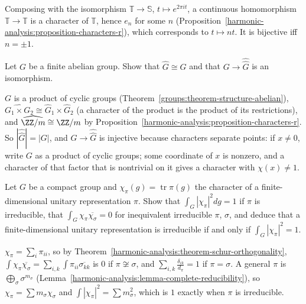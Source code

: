 \begin{solution}
Composing with the isomorphism $\mathbb{T} \to \mathbb{S}$, $t \mapsto e^{2\pi it}$, a continuous homomorphism $\mathbb{T} \to \mathbb{T}$ is a character of $\mathbb{T}$, hence $e_n$ for some $n$
(Proposition~\ref{harmonic-analysis:proposition-characters-r}), which corresponds to $t \mapsto nt$. It is bijective iff $n = \pm 1$.
\end{solution}

\begin{exercise}\label{harmonic-analysis:exercise-dual-finite}
Let $G$ be a finite abelian group. Show that $\widehat G \cong G$ and that $G \to \widehat{\widehat G}$ is an isomorphism.
\end{exercise}

\begin{solution}
$G$ is a product of cyclic groups (Theorem~\ref{groups:theorem-structure-abelian}), $\widehat{G_1 \times G_2} \cong \widehat G_1 \times \widehat G_2$ (a character of the product is the product of its restrictions),
and $\widehat{\ZZ/m} \cong \ZZ/m$ by Proposition~\ref{harmonic-analysis:proposition-characters-r}. So $|\widehat{\widehat G}| = |G|$, and $G \to \widehat{\widehat G}$ is injective because characters separate points: if $x \neq 0$, write
$G$ as a product of cyclic groups; some coordinate of $x$ is nonzero, and a character of that factor that is nontrivial on it gives a character with $\chi(x) \neq 1$.
\end{solution}

\begin{exercise}\label{harmonic-analysis:exercise-characters-orthogonal}
Let $G$ be a compact group and $\chi_\pi(g) = \operatorname{tr}\pi(g)$ the character of a finite-dimensional unitary representation $\pi$. Show that $\int_G|\chi_\pi|^2dg = 1$ if $\pi$ is irreducible, that
$\int_G\chi_\pi\overline{\chi_\sigma} = 0$ for inequivalent irreducible $\pi$, $\sigma$, and deduce that a finite-dimensional unitary representation is irreducible if and only if $\int_G|\chi_\pi|^2 = 1$.
\end{exercise}

\begin{solution}
$\chi_\pi = \sum_i\pi_{ii}$, so by Theorem~\ref{harmonic-analysis:theorem-schur-orthogonality}, $\int\chi_\pi\overline{\chi_\sigma} = \sum_{i,k}\int\pi_{ii}\overline{\sigma_{kk}}$ is $0$ if $\pi \not\cong \sigma$, and
$\sum_{i,k}\frac{\delta_{ik}}{d_\pi} = 1$ if $\pi = \sigma$. A general $\pi$ is $\bigoplus_\sigma\sigma^{m_\sigma}$ (Lemma~\ref{harmonic-analysis:lemma-complete-reducibility}), so $\chi_\pi = \sum m_\sigma\chi_\sigma$ and
$\int|\chi_\pi|^2 = \sum m_\sigma^2$, which is $1$ exactly when $\pi$ is irreducible.
\end{solution}
